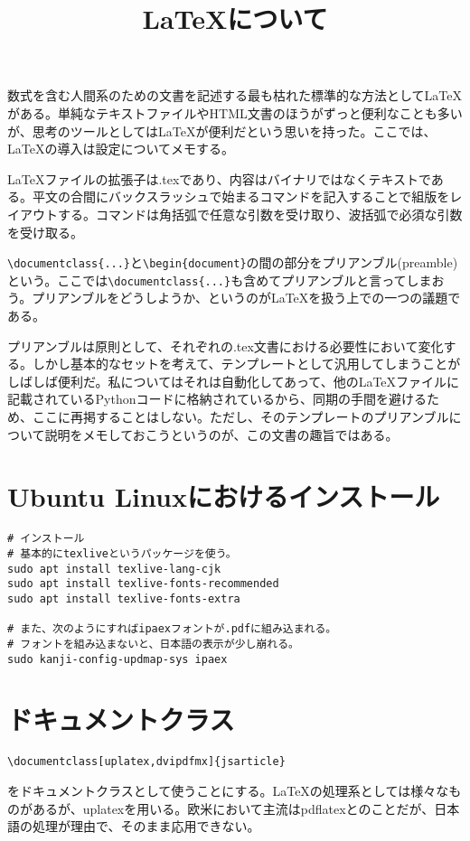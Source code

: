 \documentclass[uplatex,dvipdfmx]{jsarticle} \usepackage{amsmath,amssymb,bm}
\title{\LaTeX について} \author{} \date{}
\begin{document}
\maketitle

数式を含む人間系のための文書を記述する最も枯れた標準的な方法として\LaTeX がある。単純なテキストファイルやHTML文書のほうがずっと便利なことも多いが、思考のツールとしては\LaTeX が便利だという思いを持った。ここでは、\LaTeX の導入は設定についてメモする。

\LaTeX ファイルの拡張子は.texであり、内容はバイナリではなくテキストである。平文の合間にバックスラッシュで始まるコマンドを記入することで組版をレイアウトする。コマンドは角括弧で任意な引数を受け取り、波括弧で必須な引数を受け取る。


\verb|\documentclass{...}|と\verb|\begin{document}|の間の部分をプリアンブル(preamble)という。ここでは\verb|\documentclass{...}|も含めてプリアンブルと言ってしまおう。プリアンブルをどうしようか、というのが\LaTeX を扱う上での一つの議題である。

プリアンブルは原則として、それぞれの.tex文書における必要性において変化する。しかし基本的なセットを考えて、テンプレートとして汎用してしまうことがしばしば便利だ。私についてはそれは自動化してあって、他の\LaTeX ファイルに記載されているPythonコードに格納されているから、同期の手間を避けるため、ここに再掲することはしない。ただし、そのテンプレートのプリアンブルについて説明をメモしておこうというのが、この文書の趣旨ではある。

\section*{Ubuntu Linuxにおけるインストール}

\begin{verbatim}
# インストール
# 基本的にtexliveというパッケージを使う。
sudo apt install texlive-lang-cjk
sudo apt install texlive-fonts-recommended
sudo apt install texlive-fonts-extra

# また、次のようにすればipaexフォントが.pdfに組み込まれる。
# フォントを組み込まないと、日本語の表示が少し崩れる。
sudo kanji-config-updmap-sys ipaex
\end{verbatim}


\section*{ドキュメントクラス}
\begin{verbatim}
\documentclass[uplatex,dvipdfmx]{jsarticle}
\end{verbatim}
をドキュメントクラスとして使うことにする。\LaTeX の処理系としては様々なものがあるが、uplatexを用いる。欧米において主流はpdflatexとのことだが、日本語の処理が理由で、そのまま応用できない。
\end{document}

